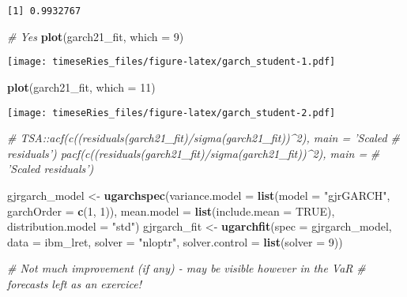 \documentclass[]{book}
\newenvironment{Shaded}{\begin{snugshade}}{\end{snugshade}}
\newcommand{\KeywordTok}[1]{\textcolor[rgb]{0.13,0.29,0.53}{\textbf{#1}}}
\newcommand{\DataTypeTok}[1]{\textcolor[rgb]{0.13,0.29,0.53}{#1}}
\newcommand{\DecValTok}[1]{\textcolor[rgb]{0.00,0.00,0.81}{#1}}
\newcommand{\StringTok}[1]{\textcolor[rgb]{0.31,0.60,0.02}{#1}}
\newcommand{\CommentTok}[1]{\textcolor[rgb]{0.56,0.35,0.01}{\textit{#1}}}
\newcommand{\OtherTok}[1]{\textcolor[rgb]{0.56,0.35,0.01}{#1}}
\newcommand{\NormalTok}[1]{#1}
\begin{document}
\begin{verbatim}
[1] 0.9932767
\end{verbatim}

\begin{Shaded}
\begin{Highlighting}[]
\CommentTok{# Yes}
\KeywordTok{plot}\NormalTok{(garch21_fit, }\DataTypeTok{which =} \DecValTok{9}\NormalTok{)}
\end{Highlighting}
\end{Shaded}

\texttt{[image: timeseRies\_files/figure-latex/garch\_student-1.pdf]}

\begin{Shaded}
\begin{Highlighting}[]
\KeywordTok{plot}\NormalTok{(garch21_fit, }\DataTypeTok{which =} \DecValTok{11}\NormalTok{)}
\end{Highlighting}
\end{Shaded}

\texttt{[image: timeseRies\_files/figure-latex/garch\_student-2.pdf]}

\begin{Shaded}
\begin{Highlighting}[]
\CommentTok{# TSA::acf(c((residuals(garch21_fit)/sigma(garch21_fit))^2), main = 'Scaled}
\CommentTok{# residuals') pacf(c((residuals(garch21_fit)/sigma(garch21_fit))^2), main =}
\CommentTok{# 'Scaled residuals')}

\NormalTok{gjrgarch_model <-}\StringTok{ }\KeywordTok{ugarchspec}\NormalTok{(}\DataTypeTok{variance.model =} \KeywordTok{list}\NormalTok{(}\DataTypeTok{model =} \StringTok{"gjrGARCH"}\NormalTok{, }\DataTypeTok{garchOrder =} \KeywordTok{c}\NormalTok{(}\DecValTok{1}\NormalTok{, }
    \DecValTok{1}\NormalTok{)), }\DataTypeTok{mean.model =} \KeywordTok{list}\NormalTok{(}\DataTypeTok{include.mean =} \OtherTok{TRUE}\NormalTok{), }\DataTypeTok{distribution.model =} \StringTok{"std"}\NormalTok{)}
\NormalTok{gjrgarch_fit <-}\StringTok{ }\KeywordTok{ugarchfit}\NormalTok{(}\DataTypeTok{spec =}\NormalTok{ gjrgarch_model, }\DataTypeTok{data =}\NormalTok{ ibm_lret, }\DataTypeTok{solver =} \StringTok{"nloptr"}\NormalTok{, }
    \DataTypeTok{solver.control =} \KeywordTok{list}\NormalTok{(}\DataTypeTok{solver =} \DecValTok{9}\NormalTok{))}

\CommentTok{# Not much improvement (if any) - may be visible however in the VaR}
\CommentTok{# forecasts left as an exercice!}
\end{Highlighting}
\end{Shaded}
\end{document}
